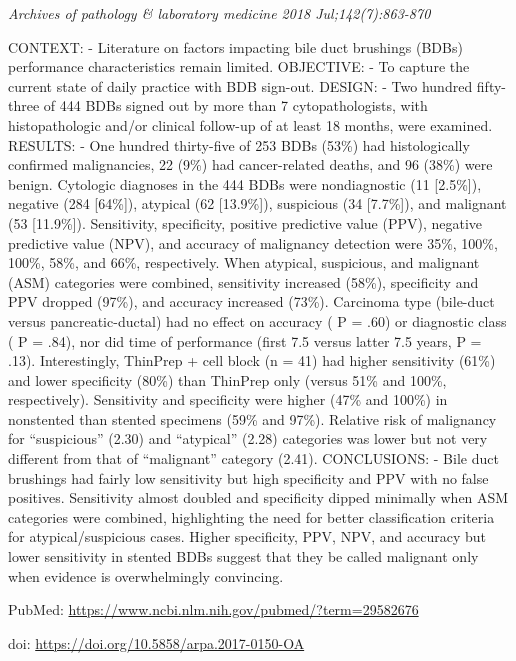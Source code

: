 \documentclass[]{article}
\begin{document}
\emph{Archives of pathology \& laboratory medicine 2018
Jul;142(7):863-870}

CONTEXT: - Literature on factors impacting bile duct brushings (BDBs)
performance characteristics remain limited. OBJECTIVE: - To capture the
current state of daily practice with BDB sign-out. DESIGN: - Two hundred
fifty-three of 444 BDBs signed out by more than 7 cytopathologists, with
histopathologic and/or clinical follow-up of at least 18 months, were
examined. RESULTS: - One hundred thirty-five of 253 BDBs (53\%) had
histologically confirmed malignancies, 22 (9\%) had cancer-related
deaths, and 96 (38\%) were benign. Cytologic diagnoses in the 444 BDBs
were nondiagnostic (11 {[}2.5\%{]}), negative (284 {[}64\%{]}), atypical
(62 {[}13.9\%{]}), suspicious (34 {[}7.7\%{]}), and malignant (53
{[}11.9\%{]}). Sensitivity, specificity, positive predictive value
(PPV), negative predictive value (NPV), and accuracy of malignancy
detection were 35\%, 100\%, 100\%, 58\%, and 66\%, respectively. When
atypical, suspicious, and malignant (ASM) categories were combined,
sensitivity increased (58\%), specificity and PPV dropped (97\%), and
accuracy increased (73\%). Carcinoma type (bile-duct versus
pancreatic-ductal) had no effect on accuracy ( P = .60) or diagnostic
class ( P = .84), nor did time of performance (first 7.5 versus latter
7.5 years, P = .13). Interestingly, ThinPrep + cell block (n = 41) had
higher sensitivity (61\%) and lower specificity (80\%) than ThinPrep
only (versus 51\% and 100\%, respectively). Sensitivity and specificity
were higher (47\% and 100\%) in nonstented than stented specimens (59\%
and 97\%). Relative risk of malignancy for ``suspicious'' (2.30) and
``atypical'' (2.28) categories was lower but not very different from
that of ``malignant'' category (2.41). CONCLUSIONS: - Bile duct
brushings had fairly low sensitivity but high specificity and PPV with
no false positives. Sensitivity almost doubled and specificity dipped
minimally when ASM categories were combined, highlighting the need for
better classification criteria for atypical/suspicious cases. Higher
specificity, PPV, NPV, and accuracy but lower sensitivity in stented
BDBs suggest that they be called malignant only when evidence is
overwhelmingly convincing.

PubMed: \url{https://www.ncbi.nlm.nih.gov/pubmed/?term=29582676}

doi: \url{https://doi.org/10.5858/arpa.2017-0150-OA}

{}

{}
\end{document}
